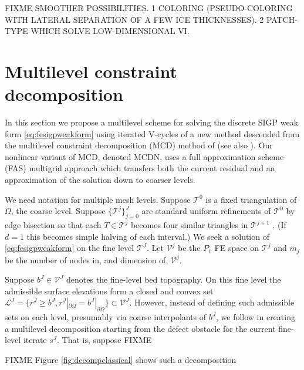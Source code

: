 \documentclass[letterpaper,final,12pt,reqno]{amsart}
\theoremstyle{claim}
\numberwithin{equation}{section}
\numberwithin{figure}{section}
\numberwithin{table}{section}
\numberwithin{theorem}{section}
\begin{document}
FIXME SMOOTHER POSSIBILITIES.  1 COLORING (PSEUDO-COLORING WITH LATERAL SEPARATION OF A FEW ICE THICKNESSES).  2 PATCH-TYPE WHICH SOLVE LOW-DIMENSIONAL VI.


\section{Multilevel constraint decomposition} \label{sec:mcdstokes}

In this section we propose a multilevel scheme for solving the discrete SIGP weak form \eqref{eq:fesigpweakform} using iterated V-cycles of a new method descended from the multilevel constraint decomposition (MCD) method of \cite{Tai2003} (see also \cite{GraeserKornhuber2009}).  Our nonlinear variant of MCD, denoted MCDN, uses a full approximation scheme (FAS) multigrid \cite{Trottenbergetal2001} approach which transfers both the current residual and an approximation of the solution down to coarser levels.

We need notation for multiple mesh levels.  Suppose $\mathcal{T}^0$ is a fixed triangulation of $\Omega$, the coarse level.  Suppose $\{\mathcal{T}^j\}_{j=0}^J$ are standard uniform refinements of $\mathcal{T}^0$ by edge bisection so that each $T \in \mathcal{T}^j$ becomes four similar triangles in $\mathcal{T}^{j+1}$ \cite{Braess2007}.  (If $d=1$ this becomes simple halving of each interval.)  We seek a solution of \eqref{eq:fesigpweakform} on the fine level $\mathcal{T}^J$.  Let $\mathcal{V}^j$ be the $P_1$ FE space on $\mathcal{T}^j$ and $m_j$ be the number of nodes in, and dimension of, $\mathcal{V}^j$.

Suppose $b^J \in \mathcal{V}^J$ denotes the fine-level bed topography.  On this fine level the admissible surface elevations form a closed and convex set $\mathcal{L}^J = \{r^J \ge b^J, r^J|_{\partial\Omega} = b^J|_{\partial\Omega}\} \subset \mathcal{V}^J$.  However, instead of defining such admissible sets on each level, presumably via coarse interpolants of $b^J$, we follow \cite{GraeserKornhuber2009} in creating a multilevel decomposition starting from the defect obstacle for the current fine-level iterate $s^J$.  That is, suppose FIXME

FIXME Figure \ref{fig:decompclassical} shows such a decomposition
\end{document}
